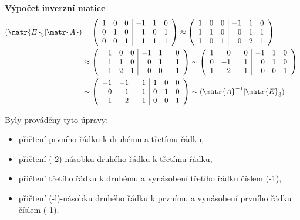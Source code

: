 \begin{mdframed}[style=mdexam]
  \begin{example}\label{mai:exam090}
    \textbf{Výpočet inverzní matice}
    \begin{gather*}
      \begin{aligned}
        (\matr{E}_3\lvert\matr{A}) &=
        \left(
        \begin{array}{rrr|rrr}
          1 & 0 & 0 & -1 & 1 & 0 \\
          0 & 1 & 0 &  1 & 0 & 1 \\
          0 & 0 & 1 &  1 & 1 & 1 
        \end{array}
        \right) \approx
        \left(
        \begin{array}{rrr|rrr}
          1 & 0 & 0 & -1 & 1 & 0 \\
          1 & 1 & 0 &  0 & 1 & 1 \\
          1 & 0 & 1 &  0 & 2 & 1 
        \end{array}
        \right)         \\
        &\approx    
        \left(
        \begin{array}{rrr|rrr}
          1 & 0 & 0 & -1 & 1 &  0 \\
          1 & 1 & 0 &  0 & 1 &  1 \\
          -1 & 2 & 1 &  0 & 0 & -1 
        \end{array}
        \right) \sim   
        \left(
        \begin{array}{rrr|rrr}
          1 &  0 &  0 & -1 & 1 &  0 \\
          0 & -1 &  1 &  0 & 1 &  0 \\
          1 &  2 & -1 &  0 & 0 &  1 
        \end{array}   
        \right)~    \\
        &\sim
        \left(
        \begin{array}{rrr|rrr}
          -1 & -1 &  1 &  1 & 0 &  0 \\
           0 & -1 &  1 &  0 & 1 &  0 \\
           1 &  2 & -1 &  0 & 0 &  1 
        \end{array}
        \right) \sim (\matr{A}^{-1}\lvert\matr{E}_3)   
      \end{aligned}  
    \end{gather*}

    Byly prováděny tyto úpravy:
    \begin{itemize}[noitemsep]
      \item přičtení prvního řádku k druhému a třetímu řádku,
      \item přičtení (-2)-násobku druhého řádku k třetímu řádku,
      \item přičtení třetího řádku k druhému a vynásobení třetího řádku číslem (-1),
      \item přičtení (-l)-násobku druhého řádku k prvnímu a vynásobení prvního řádku číslem (-1).
    \end{itemize}
  \end{example}
\end{mdframed}